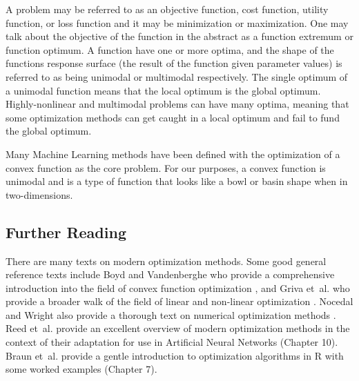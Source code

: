 \begin{bibunit}
A problem may be referred to as an objective function, cost function, utility function, or loss function and it may be minimization or maximization. One may talk about the objective of the function in the abstract as a function extremum or function optimum. 
A function have one or more optima, and the shape of the functions response surface (the result of the function given parameter values) is referred to as being unimodal or multimodal respectively. The single optimum of a unimodal function means that the local optimum is the global optimum. Highly-nonlinear and multimodal problems can have many optima, meaning that some optimization methods can get caught in a local optimum and fail to fund the global optimum.

Many Machine Learning methods have been defined with the optimization of a convex function as the core problem. For our purposes, a convex function is unimodal and is a type of function that looks like a bowl or basin shape when in two-dimensions.

\subsection{Further Reading}
There are many texts on modern optimization methods. Some good general reference texts include Boyd and Vandenberghe  who provide a comprehensive introduction into the field of convex function optimization \cite{Boyd2004}, and Griva et~al. who provide a broader walk of the field of linear and non-linear optimization \cite{Griva2009}. Nocedal and Wright also provide a thorough text on numerical optimization methods \cite{Nocedal1999}.
Reed et~al. provide an excellent overview of modern optimization methods in the context of their adaptation for use in Artificial Neural Networks \cite{Reed1998} (Chapter 10).
Braun et~al. provide a gentle introduction to optimization algorithms in R with some worked examples \cite{Braun2007} (Chapter 7).

\putbib
\end{bibunit}

\newpage\begin{bibunit}\putbib\end{bibunit}
\newpage\begin{bibunit}\putbib\end{bibunit}
\newpage\begin{bibunit}\putbib\end{bibunit}
\newpage\begin{bibunit}\putbib\end{bibunit}
\newpage\begin{bibunit}\putbib\end{bibunit}
